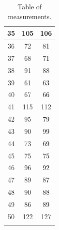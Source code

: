 \documentclass[11pt,a4paper]{article}
\begin{document}
\begin{center}
\begin{longtable}{|c|c|c|}
        35 & 105 & 106 \\\hline
        36 & 72 & 81 \\\hline
        37 & 68 & 71 \\\hline
        38 & 91 & 88 \\\hline
        39 & 61 & 63 \\\hline
        40 & 67 & 66 \\\hline
        41 & 115 & 112 \\\hline
        42 & 95 & 79 \\\hline
        43 & 90 & 99 \\\hline
        44 & 73 & 69 \\\hline
        45 & 75 & 75 \\\hline
        46 & 96 & 92 \\\hline
        47 & 89 & 87 \\\hline
        48 & 90 & 88 \\\hline
        49 & 86 & 89 \\\hline
        50 & 122 & 127 \\\hline
        \caption{Table of measurements.}
        \label{fig:measurements}
    \end{longtable}
\end{center}
\end{document}

